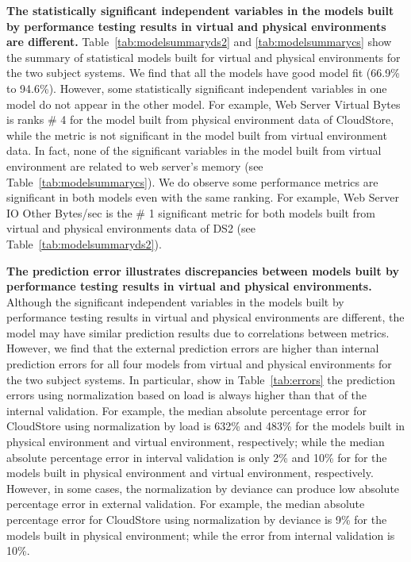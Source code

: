 \noindent \textbf{The statistically significant independent variables in the models built by performance testing results in virtual and physical environments are different.} Table~\ref{tab:modelsummaryds2} and \ref{tab:modelsummarycs} show the summary of statistical models built for virtual and physical environments for the two subject systems. We find that all the models have good model fit (66.9\% to 94.6\%). However, some statistically significant independent variables in one model do not appear in the other model. For example, Web Server Virtual Bytes is ranks \# 4 for the model built from physical environment data of CloudStore, while the metric is not significant in the model built from virtual environment data. In fact, none of the significant variables in the model built from virtual environment are related to web server's memory (see Table~\ref{tab:modelsummarycs}). We do observe some performance metrics are significant in both models even with the same ranking. For example, Web Server IO Other Bytes/sec is the \# 1 significant metric for both models built from virtual and physical environments data of DS2 (see Table~\ref{tab:modelsummaryds2}). 

\noindent \textbf{The prediction error illustrates discrepancies between models built by performance testing results in virtual and physical environments.} Although the significant independent variables in the models built by performance testing results in virtual and physical environments are different, the model may have similar prediction results due to correlations between metrics. However, we find that the external prediction errors are higher than internal prediction errors for all four models from virtual and physical environments for the two subject systems. In particular, show in Table~\ref{tab:errors} the prediction errors using normalization based on load is always higher than that of the internal validation. For example, the median absolute percentage error for CloudStore using normalization by load is 632\% and 483\% for the models built in physical environment and virtual environment, respectively; while the median absolute percentage error in interval validation is only 2\% and 10\% for for the models built in physical environment and virtual environment, respectively. However, in some cases, the normalization by deviance can produce low absolute percentage error in external validation. For example, the median absolute percentage error for CloudStore using normalization by deviance is 9\% for the models built in physical environment; while the error from internal validation is 10\%. 

